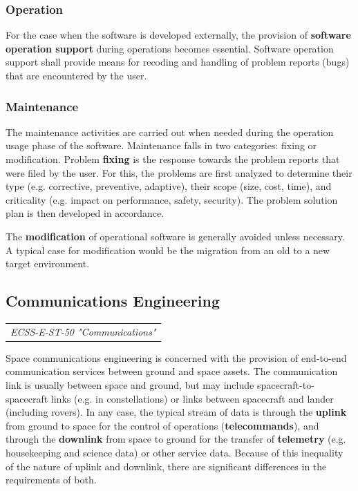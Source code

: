 \subsubsection{Operation}

For the case when the software is developed externally, the provision of \textbf{software operation support} during operations becomes essential. Software operation support shall provide means for recoding and handling of problem reports (bugs) that are encountered by the user.

\subsubsection{Maintenance}

The maintenance activities are carried out when needed during the operation usage phase of the software. Maintenance falls in two categories: fixing or modification. Problem \textbf{fixing} is the response towards the problem reports that were filed by the user. For this, the problems are first analyzed to determine their type (e.g. corrective, preventive, adaptive), their scope (size, cost, time), and criticality (e.g. impact on performance, safety, security). The problem solution plan is then developed in accordance.

The \textbf{modification} of operational software is generally avoided unless necessary. A typical case for modification would be the migration from an old to a new target environment.

\subsection{Communications Engineering}

\begin{tabular}{l}
\textit{ECSS-E-ST-50 "Communications" \cite{ECSS-E-ST-50}}
\end{tabular}

Space communications engineering is concerned with the provision of end-to-end communication services between ground and space assets. The communication link is usually between space and ground, but may include spacecraft-to-spacecraft links (e.g. in constellations) or links between spacecraft and lander (including rovers). In any case, the typical stream of data is through the \textbf{uplink} from ground to space for the control of operations (\textbf{telecommands}), and through the \textbf{downlink} from space to ground for the transfer of \textbf{telemetry} (e.g. housekeeping and science data) or other service data. Because of this inequality of the nature of uplink and downlink, there are significant differences in the requirements of both.

